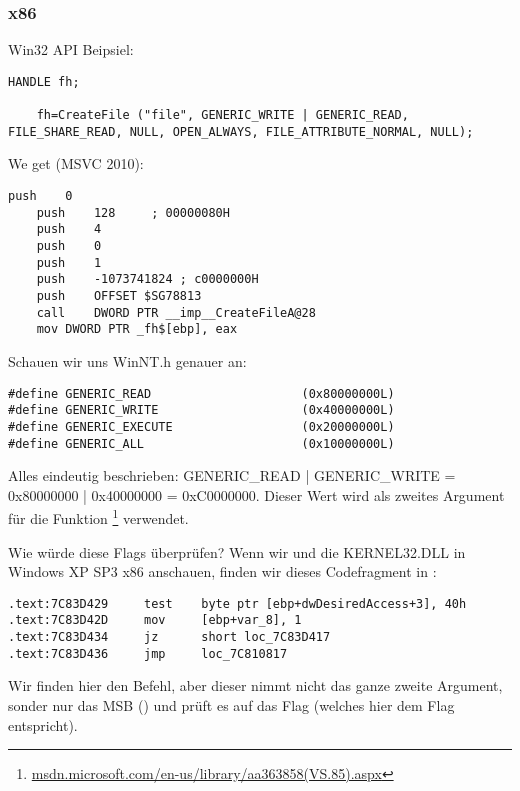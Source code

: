 \subsubsection{x86}

Win32 API Beipsiel:

\begin{lstlisting}[style=customc]
	HANDLE fh;

	fh=CreateFile ("file", GENERIC_WRITE | GENERIC_READ, FILE_SHARE_READ, NULL, OPEN_ALWAYS, FILE_ATTRIBUTE_NORMAL, NULL);
\end{lstlisting}

We get (MSVC 2010):

\begin{lstlisting}[caption=MSVC 2010,style=customasmx86]
	push	0
	push	128		; 00000080H
	push	4
	push	0
	push	1
	push	-1073741824	; c0000000H
	push	OFFSET $SG78813
	call	DWORD PTR __imp__CreateFileA@28
	mov	DWORD PTR _fh$[ebp], eax
\end{lstlisting}

Schauen wir uns WinNT.h genauer an:

\begin{lstlisting}[caption=WinNT.h,style=customc]
#define GENERIC_READ                     (0x80000000L)
#define GENERIC_WRITE                    (0x40000000L)
#define GENERIC_EXECUTE                  (0x20000000L)
#define GENERIC_ALL                      (0x10000000L)
\end{lstlisting}
Alles eindeutig beschrieben: GENERIC\_READ | GENERIC\_WRITE = 0x80000000 |
0x40000000 = 0xC0000000. Dieser Wert wird als zweites Argument für die Funktion
\footnote{\href{http://msdn.microsoft.com/en-us/library/aa363858(VS.85).aspx}{msdn.microsoft.com/en-us/library/aa363858(VS.85).aspx}}
verwendet.

Wie würde  diese Flags überprüfen?
Wenn wir und die KERNEL32.DLL in Windows XP SP3 x86 anschauen, finden wir dieses
Codefragment in :

\begin{lstlisting}[caption=KERNEL32.DLL (Windows XP SP3 x86),style=customasmx86]
.text:7C83D429     test    byte ptr [ebp+dwDesiredAccess+3], 40h
.text:7C83D42D     mov     [ebp+var_8], 1
.text:7C83D434     jz      short loc_7C83D417
.text:7C83D436     jmp     loc_7C810817
\end{lstlisting}

Wir finden hier den \TEST Befehl, aber dieser nimmt nicht das ganze zweite
Argument, sonder nur das MSB () und prüft es auf das
Flag  (welches hier dem  Flag entspricht).

